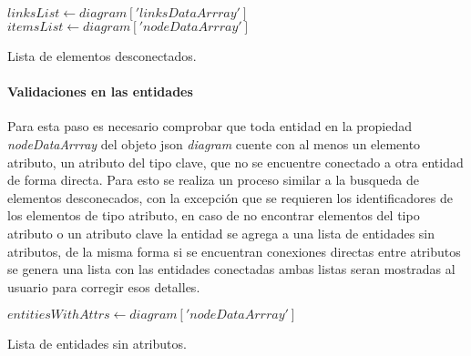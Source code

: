 \begin{algorithm}[H]

  $linksList \gets diagram['linksDataArrray']$\\
  $itemsList \gets diagram['nodeDataArrray']$\\
  
  \caption{Lista de elementos desconectados.}
\end{algorithm}


\paragraph*{Validaciones en las entidades}

Para esta paso es necesario comprobar que toda entidad en la propiedad \textit{nodeDataArrray} del objeto json \textit{diagram} cuente con al menos un elemento atributo, un atributo del tipo clave, que no se encuentre conectado a otra entidad de forma directa. Para esto se realiza un proceso similar a la busqueda de elementos desconecados, con la excepción que se requieren los identificadores de los elementos de tipo atributo, en caso de no encontrar  elementos  del tipo atributo o un atributo clave la entidad se agrega a una lista de entidades sin atributos, de la misma forma si se encuentran conexiones directas entre atributos se genera una lista con las entidades conectadas ambas listas seran mostradas al usuario para corregir esos detalles.

\begin{algorithm}[H]

  $entitiesWithAttrs \gets diagram['nodeDataArrray']$\\
  
  \caption{Lista de entidades sin atributos.}
\end{algorithm}

